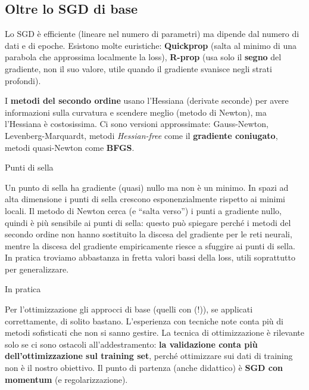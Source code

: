 \subsection{Oltre lo SGD di base}\label{oltre-lo-sgd-di-base}

Lo SGD è efficiente (lineare nel numero di parametri) ma dipende dal
numero di dati e di epoche. Esistono molte euristiche:
\textbf{Quickprop} (salta al minimo di una parabola che approssima
localmente la loss), \textbf{R-prop} (usa solo il \textbf{segno} del
gradiente, non il suo valore, utile quando il gradiente svanisce negli
strati profondi).

I \textbf{metodi del secondo ordine} usano l'Hessiana (derivate seconde)
per avere informazioni sulla curvatura e scendere meglio (metodo di
Newton), ma l'Hessiana è costosissima. Ci sono versioni approssimate:
Gauss-Newton, Levenberg-Marquardt, metodi \emph{Hessian-free} come il
\textbf{gradiente coniugato}, metodi quasi-Newton come \textbf{BFGS}.

\begin{boxnote}{Punti di sella}

Un punto di sella ha gradiente (quasi) nullo ma non è un minimo. In
spazi ad alta dimensione i punti di sella crescono esponenzialmente
rispetto ai minimi locali. Il metodo di Newton cerca (e ``salta verso'')
i punti a gradiente nullo, quindi è più sensibile ai punti di sella:
questo può spiegare perché i metodi del secondo ordine non hanno
sostituito la discesa del gradiente per le reti neurali, mentre la
discesa del gradiente empiricamente riesce a sfuggire ai punti di sella.
In pratica troviamo abbastanza in fretta valori bassi della loss, utili
soprattutto per generalizzare.

\end{boxnote}

\begin{boxtip}{In pratica}

Per l'ottimizzazione gli approcci di base (quelli con (!)), se applicati
correttamente, di solito bastano. L'esperienza con tecniche note conta
più di metodi sofisticati che non si sanno gestire. La tecnica di
ottimizzazione è rilevante solo se ci sono ostacoli all'addestramento:
\textbf{la validazione conta più dell'ottimizzazione sul training set},
perché ottimizzare sui dati di training non è il nostro obiettivo. Il
punto di partenza (anche didattico) è \textbf{SGD con momentum} (e
regolarizzazione).

\end{boxtip}

